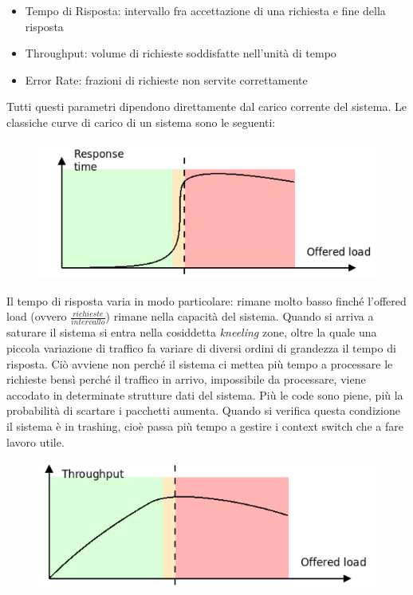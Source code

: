 \documentclass{article}
\begin{document}
		\begin{itemize}
			\item Tempo di Risposta: intervallo fra accettazione di una richiesta e fine della risposta
			\item Throughput: volume di richieste soddisfatte nell'unità di tempo
			\item Error Rate: frazioni di richieste non servite correttamente
		\end{itemize}
		
		Tutti questi parametri dipendono direttamente dal carico corrente del sistema. Le classiche curve di carico di un sistema sono le seguenti:
		\begin{figure}[ht]
			\centering
			\includegraphics[width=0.7\linewidth]{SAC_D1_load1}
		
			\label{fig:sacd1load1}
		\end{figure}
		
		Il tempo di risposta varia in modo particolare: rimane molto basso finché l’offered load (ovvero $\frac{richieste}{intervallo}$) rimane nella capacità del sistema. Quando si arriva
		a saturare il sistema si entra nella cosiddetta \textit{kneeling} zone, oltre la quale una piccola variazione
		di traffico fa variare di diversi ordini di grandezza il tempo di risposta.
		Ciò avviene non perché il sistema ci mettea più tempo a processare le richieste bensì perché il traffico in arrivo, impossibile da processare, viene accodato in determinate strutture dati del sistema.
		Più le code sono piene, più la probabilità di scartare i pacchetti aumenta. Quando si verifica questa condizione il sistema è in trashing, cioè passa più tempo a gestire i context switch che a fare lavoro utile.
		
		\begin{figure}[ht]
			\centering
			\includegraphics[width=0.7\linewidth]{SAC_D1_load2}
			\label{fig:sacd1load2}
		\end{figure}
		
\end{document}
